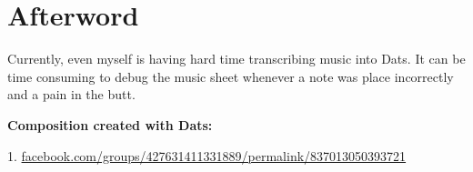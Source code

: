 \documentclass{article}
\begin{document}
\section*{Afterword}

Currently, even myself is having hard time transcribing music into Dats. It can be time consuming to debug the music sheet whenever a note was place 
incorrectly and a pain in the butt.

\textbf{Composition created with Dats:}

1. \url{facebook.com/groups/427631411331889/permalink/837013050393721}
\end{document}
